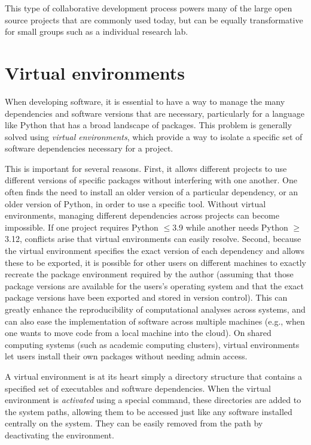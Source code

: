 This type of collaborative development process powers many of the large open source projects that are commonly used today, but can be equally transformative for small groups such as a individual research lab.

\section{Virtual environments}

When developing software, it is essential to have a way to manage the many dependencies and software versions that are necessary, particularly for a language like Python that has a broad landscape of packages.
This problem is generally solved using \textit{virtual environments}, which provide a way to isolate a specific set of software dependencies necessary for a project.

This is important for several reasons.
First, it allows different projects to use different versions of specific packages without interfering with one another.
One often finds the need to install an older version of a particular dependency, or an older version of Python, in order to use a specific tool.
Without virtual environments, managing different dependencies across projects can become impossible.
If one project requires Python $\leq$3.9 while another needs Python $\geq$3.12, conflicts arise that virtual environments can easily resolve.
Second, because the virtual environment specifies the exact version of each dependency and allows these to be exported, it is possible for other users on different machines to exactly recreate the package environment required by the author (assuming that those package versions are available for the users's operating system and that the exact package versions have been exported and stored in version control).
This can greatly enhance the reproducibility of computational analyses across systems, and can also ease the implementation of software across multiple machines (e.g., when one wants to move code from a local machine into the cloud).
On shared computing systems (such as academic computing clusters), virtual environments let users install their own packages without needing admin access.

A virtual environment is at its heart simply a directory structure that contains a specified set of executables and software dependencies.
When the virtual environment is \textit{activated} using a special command, these directories are added to the system paths, allowing them to be accessed just like any software installed centrally on the system.
They can be easily removed from the path by deactivating the environment.

